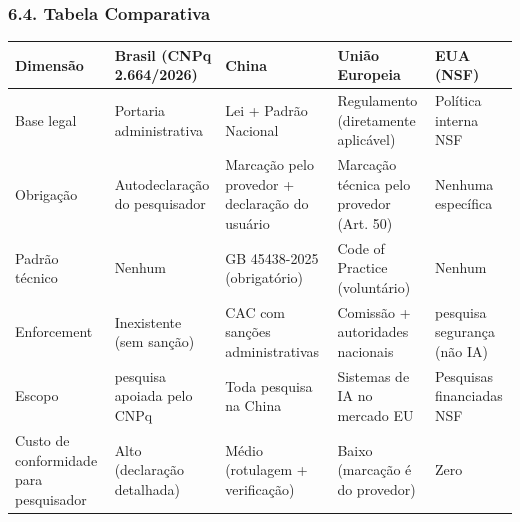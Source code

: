 \documentclass[
  12pt,
  a4paper,
  brazil
]{article}
\begin{document}
\subsubsection{6.4. Tabela Comparativa}\label{tabela-comparativa}

{\def\LTcaptype{none} %
\begin{longtable}[]{@{}
  >{\raggedright\arraybackslash}p{}
  >{\raggedright\arraybackslash}p{}
  >{\raggedright\arraybackslash}p{}
  >{\raggedright\arraybackslash}p{}
  >{\raggedright\arraybackslash}p{}@{}}
\toprule\noalign{}
\begin{minipage}[b]{\linewidth}\raggedright
Dimensão
\end{minipage} & \begin{minipage}[b]{\linewidth}\raggedright
Brasil (CNPq 2.664/2026)
\end{minipage} & \begin{minipage}[b]{\linewidth}\raggedright
China
\end{minipage} & \begin{minipage}[b]{\linewidth}\raggedright
União Europeia
\end{minipage} & \begin{minipage}[b]{\linewidth}\raggedright
EUA (NSF)
\end{minipage} \\
\midrule\noalign{}
\endhead
\bottomrule\noalign{}
\endlastfoot
Base legal & Portaria administrativa & Lei + Padrão Nacional &
Regulamento (diretamente aplicável) & Política interna NSF \\
Obrigação & Autodeclaração do pesquisador & Marcação pelo provedor +
declaração do usuário & Marcação técnica pelo provedor (Art. 50) &
Nenhuma específica \\
Padrão técnico & Nenhum & GB 45438-2025 (obrigatório) & Code of Practice
(voluntário) & Nenhum \\
Enforcement & Inexistente (sem sanção) & CAC com sanções administrativas
& Comissão + autoridades nacionais & pesquisa segurança (não IA) \\
Escopo & pesquisa apoiada pelo CNPq & Toda pesquisa na China & Sistemas
de IA no mercado EU & Pesquisas financiadas NSF \\
Custo de conformidade para pesquisador & Alto (declaração detalhada) &
Médio (rotulagem + verificação) & Baixo (marcação é do provedor) &
Zero \\
\end{longtable}
}
\end{document}
